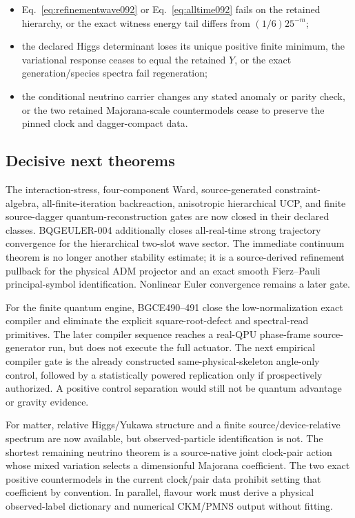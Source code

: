 \documentclass[11pt]{article}
\theoremstyle{definition}
\theoremstyle{remark}
\begin{document}
\begin{itemize}
\item Eq.~\eqref{eq:refinementwave092} or Eq.~\eqref{eq:alltime092} fails on the retained hierarchy, or the exact witness energy tail differs from $(1/6)25^{-m}$;
\item the declared Higgs determinant loses its unique positive finite minimum, the variational response ceases to equal the retained $Y$, or the exact generation/species spectra fail regeneration;
\item the conditional neutrino carrier changes any stated anomaly or parity check, or the two retained Majorana-scale countermodels cease to preserve the pinned clock and dagger-compact data.
\end{itemize}

\subsection{Decisive next theorems}

The interaction-stress, four-component Ward, source-generated constraint-algebra, all-finite-iteration backreaction, anisotropic hierarchical UCP, and finite source-dagger quantum-reconstruction gates are now closed in their declared classes. BQGEULER-004 additionally closes all-real-time strong trajectory convergence for the hierarchical two-slot wave sector. The immediate continuum theorem is no longer another stability estimate; it is a source-derived refinement pullback for the physical ADM projector and an exact smooth Fierz--Pauli principal-symbol identification. Nonlinear Euler convergence remains a later gate.

For the finite quantum engine, BGCE490--491 close the low-normalization exact compiler and eliminate the explicit square-root-defect and spectral-read primitives. The later compiler sequence reaches a real-QPU phase-frame source-generator run, but does not execute the full actuator. The next empirical compiler gate is the already constructed same-physical-skeleton angle-only control, followed by a statistically powered replication only if prospectively authorized. A positive control separation would still not be quantum advantage or gravity evidence.

For matter, relative Higgs/Yukawa structure and a finite source/device-relative spectrum are now available, but observed-particle identification is not. The shortest remaining neutrino theorem is a source-native joint clock-pair action whose mixed variation selects a dimensionful Majorana coefficient. The two exact positive countermodels in the current clock/pair data prohibit setting that coefficient by convention. In parallel, flavour work must derive a physical observed-label dictionary and numerical CKM/PMNS output without fitting.
\end{document}
